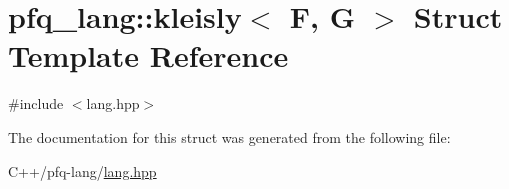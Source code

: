 \hypertarget{structpfq__lang_1_1kleisly}{\section{pfq\+\_\+lang\+:\+:kleisly$<$ F, G $>$ Struct Template Reference}
\label{structpfq__lang_1_1kleisly}
}


{\ttfamily \#include $<$lang.\+hpp$>$}



The documentation for this struct was generated from the following file\+:\begin{DoxyCompactItemize}
\item 
C++/pfq-\/lang/\hyperlink{lang_8hpp}{lang.\+hpp}\end{DoxyCompactItemize}
